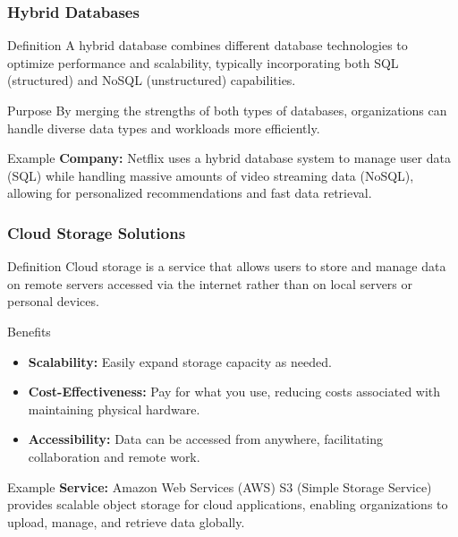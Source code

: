 \documentclass[aspectratio=169]{beamer}
\begin{document}
\begin{frame}[fragile]
    \frametitle{Hybrid Databases}
    \begin{block}{Definition}
        A hybrid database combines different database technologies to optimize performance and scalability, typically incorporating both SQL (structured) and NoSQL (unstructured) capabilities.
    \end{block}
    
    \begin{block}{Purpose}
        By merging the strengths of both types of databases, organizations can handle diverse data types and workloads more efficiently.
    \end{block}
    
    \begin{block}{Example}
        \textbf{Company:} Netflix uses a hybrid database system to manage user data (SQL) while handling massive amounts of video streaming data (NoSQL), allowing for personalized recommendations and fast data retrieval.
    \end{block}
\end{frame}

\begin{frame}[fragile]
    \frametitle{Cloud Storage Solutions}
    \begin{block}{Definition}
        Cloud storage is a service that allows users to store and manage data on remote servers accessed via the internet rather than on local servers or personal devices.
    \end{block}
    
    \begin{block}{Benefits}
        \begin{itemize}
            \item \textbf{Scalability:} Easily expand storage capacity as needed.
            \item \textbf{Cost-Effectiveness:} Pay for what you use, reducing costs associated with maintaining physical hardware.
            \item \textbf{Accessibility:} Data can be accessed from anywhere, facilitating collaboration and remote work.
        \end{itemize}
    \end{block}
    
    \begin{block}{Example}
        \textbf{Service:} Amazon Web Services (AWS) S3 (Simple Storage Service) provides scalable object storage for cloud applications, enabling organizations to upload, manage, and retrieve data globally.
    \end{block}
\end{frame}
\end{document}
